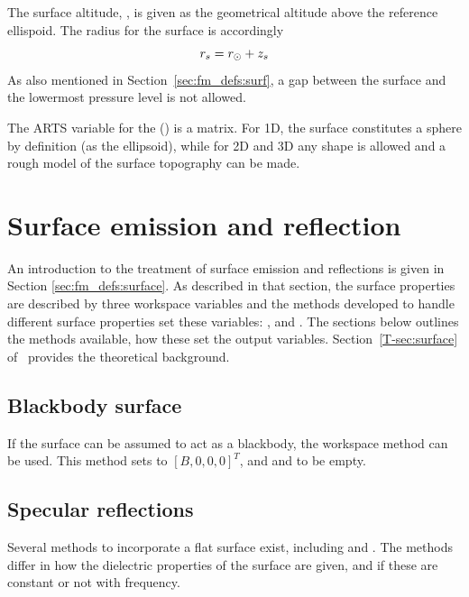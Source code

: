 The surface altitude, , is given as the geometrical altitude above the
reference ellispoid. The radius for the surface is accordingly
\begin{equation}
  r_{s} = r_{\odot} + z_{s}
 \label{eq:fm_defs:zsurface}
\end{equation}
As also mentioned in Section~\ref{sec:fm_defs:surf}, a gap between the surface
and the lowermost pressure level is not allowed.

The ARTS variable for the  ()
is a matrix. For 1D, the surface constitutes a sphere by definition (as the
ellipsoid), while for 2D and 3D any shape is allowed and a rough model of the
surface topography can be made.




\section{Surface emission and reflection}
\label{sec:surf:eandr}

An introduction to the treatment of surface emission and reflections is given
in Section \ref{sec:fm_defs:surface}. As described in that section, the surface
properties are described by three workspace variables and the methods developed
to handle different surface properties set these variables:
,  and
. The sections below outlines the methods available,
how these set the output variables.
Section~\ref{T-sec:surface} of \theory\ provides the theoretical
background.



\subsection{Blackbody surface}
%
If the surface can be assumed to act as a blackbody, the workspace method
 can be used. This method sets
 to $[B,0,0,0]^T$, and 
and  to be empty.




\subsection{Specular reflections}
%
Several methods to incorporate a flat surface exist, including
 and
. The methods differ in how the dielectric
properties of the surface are given, and if these are constant or not with
frequency.

